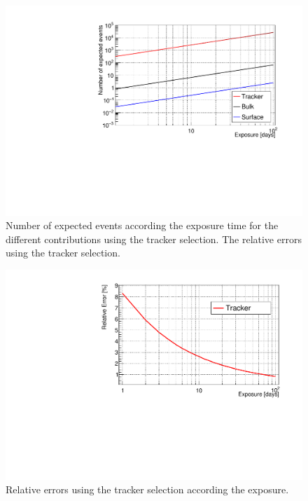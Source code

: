 \documentclass[main.tex]{subfiles}
\begin{document}
\begin{figure}[h!]
\begin{center}
\includegraphics[scale=0.5]{pictures/Chap5/nexpected_tracker_selection.pdf}
\caption{Number of expected events according the exposure time for the different contributions using the tracker selection. The relative errors using the tracker selection.}
\label{picture_number_of_expected_events_tracker_selection}
\end{center}
\end{figure}

\begin{figure}[h!]
\begin{center}
\includegraphics[scale=0.5]{pictures/Chap5/rr.pdf}
\caption{Relative errors using the tracker selection according the exposure.}
\label{picture_relative_error_tracker_selection}
\end{center}
\end{figure}
\end{document}

